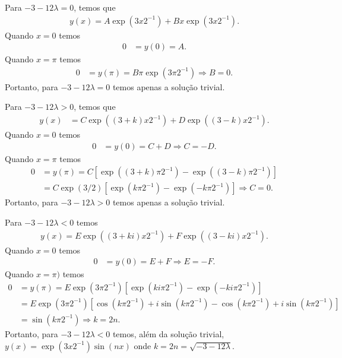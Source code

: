\documentclass[a4paper,12pt, leqno, answers]{exam}
\begin{document}
\begin{questions}
\begin{parts}
\begin{solution}
            Para $-3 - 12 \lambda = 0$, temos que
            \begin{align*}
                y(x) = A \exp(3 x 2^{-1}) + B x \exp(3 x 2^{-1}).
            \end{align*}
            Quando $x = 0$ temos
            \begin{align*}
                0 &= y(0) = A.
            \end{align*}
            Quando $x = \pi$ temos
            \begin{align*}
                0 &= y(\pi) = B \pi \exp(3 \pi 2^{-1}) \Rightarrow B = 0.
            \end{align*}
            Portanto, para $-3 - 12 \lambda = 0$ temos apenas a solu\c{c}\~{a}o trivial.

            Para $-3 - 12 \lambda > 0$, temos que
            \begin{align*}
                y(x) &= C \exp\left( (3 + k) x 2^{-1} \right) + D \exp\left( (3 - k) x 2^{-1} \right).
            \end{align*}
            Quando $x = 0$ temos
            \begin{align*}
                0 &= y(0) = C + D \Rightarrow C = - D.
            \end{align*}
            Quando $x = \pi$ temos
            \begin{align*}
                0 &= y(\pi) = C \left[ \exp\left( (3 + k) \pi 2^{-1} \right) - \exp\left( (3 - k) \pi 2^{-1} \right) \right] \\
                &= C \exp(3/2) \left[ \exp(k \pi 2^{-1}) - \exp(- k \pi 2^{-1}) \right] \Rightarrow C = 0.
            \end{align*}
            Portanto, para $-3 - 12 \lambda > 0$ temos apenas a solu\c{c}\~{a}o trivial.


            Para $-3 - 12 \lambda < 0$ temos
            \begin{align*}
                y(x) = E \exp\left( (3 + k i) x 2^{-1} \right) + F \exp\left( (3 - k i) x 2^{-1} \right).
            \end{align*}
            Quando $x = 0$ temos
            \begin{align*}
                0 &= y(0) = E + F \Rightarrow E = - F.
            \end{align*}
            Quando $x = \pi)$ temos
            \begin{align*}
                0 &= y(\pi) = E \exp(3 \pi 2^{-1}) \left[ \exp(k i \pi 2^{-1}) - \exp(- k i \pi 2^{-1}) \right] \\
                &= E \exp(3 \pi 2^{-1}) \left[ \cos(k \pi 2^{-1}) + i \sin(k \pi 2^{-1}) - \cos(k \pi 2^{-1}) + i \sin(k \pi 2^{-1}) \right] \\
                &= \sin(k \pi 2^{-1}) \Rightarrow k = 2n.
            \end{align*}
            Portanto, para $-3 - 12 \lambda < 0$ temos, al\'{e}m da solu\c{c}\~{a}o trivial, $y(x) = \exp(3 x 2^{-1}) \sin(n x)$ onde $k = 2n = \sqrt{- 3 - 12 \lambda}$.


\end{solution}
\end{parts}
\end{questions}
\end{document}
